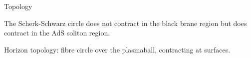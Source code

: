 \documentclass{beamer}
\begin{document}
\begin{frame}{Topology}
%

 The Scherk-Schwarz circle does not contract in the black brane region but does contract in the AdS soliton region.
 \begin{center}
   
 \end{center}
 Horizon topology: fibre circle over the plasmaball, contracting at surfaces.
%
\end{frame}
\end{document}
